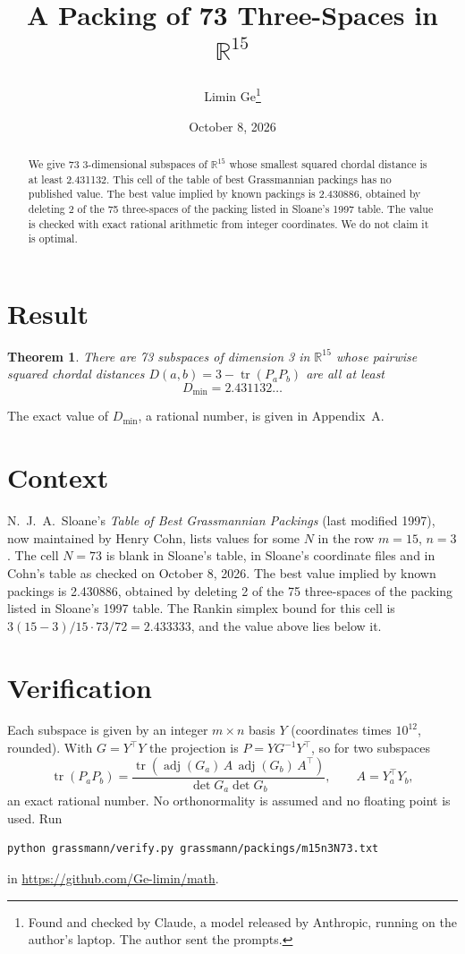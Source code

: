 \documentclass[11pt,a4paper]{article}
\title{A Packing of 73 Three-Spaces in $\mathbb{R}^{15}$}
\author{Limin Ge\thanks{Found and checked by Claude, a model released by Anthropic, running on the author's laptop. The author sent the prompts.}}
\date{October 8, 2026}
\newtheorem*{theorem}{Theorem}
\begin{document}
\maketitle
\begin{abstract}
We give 73 3-dimensional subspaces of $\mathbb{R}^{15}$ whose smallest squared chordal distance is at least 2.431132. This cell of the table of best Grassmannian packings has no published value. The best value implied by known packings is 2.430886, obtained by deleting 2 of the 75 three-spaces of the packing listed in Sloane's 1997 table. The value is checked with exact rational arithmetic from integer coordinates. We do not claim it is optimal.
\end{abstract}

\section{Result}
\begin{theorem}
There are 73 subspaces of dimension 3 in $\mathbb{R}^{15}$ whose pairwise squared chordal distances $D(a,b) = 3 - \operatorname{tr}(P_aP_b)$ are all at least
\[ D_{\min} = 2.431132\ldots \]
\end{theorem}
The exact value of $D_{\min}$, a rational number, is given in Appendix~A.


\section{Context}
N.~J.~A.~Sloane's \emph{Table of Best Grassmannian Packings} (last modified 1997), now maintained by Henry Cohn, lists values for some $N$ in the row $m=15$, $n=3$. The cell $N=73$ is blank in Sloane's table, in Sloane's coordinate files and in Cohn's table as checked on October 8, 2026. The best value implied by known packings is 2.430886, obtained by deleting 2 of the 75 three-spaces of the packing listed in Sloane's 1997 table. The Rankin simplex bound for this cell is $3(15-3)/15\cdot 73/72 = 2.433333$, and the value above lies below it.


\section{Verification}
Each subspace is given by an integer $m\times n$ basis $Y$ (coordinates times $10^{12}$, rounded). With $G=Y^\top Y$ the projection is $P=YG^{-1}Y^\top$, so for two subspaces
\[ \operatorname{tr}(P_aP_b)=\frac{\operatorname{tr}(\operatorname{adj}(G_a)\,A\,\operatorname{adj}(G_b)\,A^\top)}{\det G_a\det G_b},\qquad A=Y_a^\top Y_b, \]
an exact rational number. No orthonormality is assumed and no floating point is used. Run
\begin{verbatim}
python grassmann/verify.py grassmann/packings/m15n3N73.txt
\end{verbatim}
in \url{https://github.com/Ge-limin/math}.
\end{document}
